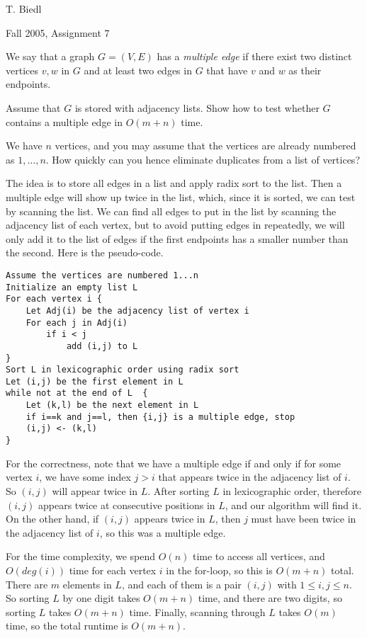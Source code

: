 \begin{authorship}
T. Biedl
\end{authorship}
\begin{usage}
Fall 2005, Assignment 7
\end{usage}

We say that a graph $G=(V,E)$ has a {\em multiple edge} if there
exist two distinct vertices $v,w$ in $G$ and at least two edges
in $G$ that have $v$ and $w$ as their endpoints.

Assume that $G$ is stored with adjacency lists.  Show how to test
whether $G$ contains a multiple edge in $O(m+n)$ time.

\begin{hint}
We have $n$ vertices, and you may assume that the vertices are
already numbered as $1,\dots,n$.  How quickly can you hence
eliminate duplicates from a list of vertices?
\end{hint}

\begin{solution}
The idea is to store all edges in a list and apply radix sort to
the list.  Then a multiple edge will show up twice in the list, which,
since it is sorted, we can test by scanning the list.  We can find all
edges to put in the list by scanning the adjacency list of each vertex,
but to avoid putting edges in repeatedly, we will only add it to the
list of edges if the first endpoints has a smaller number than the second.
Here is the
pseudo-code.

\begin{verbatim}
Assume the vertices are numbered 1...n
Initialize an empty list L
For each vertex i {
    Let Adj(i) be the adjacency list of vertex i
    For each j in Adj(i)
        if i < j
            add (i,j) to L
}
Sort L in lexicographic order using radix sort
Let (i,j) be the first element in L
while not at the end of L  {
    Let (k,l) be the next element in L
    if i==k and j==l, then {i,j} is a multiple edge, stop
    (i,j) <- (k,l)
}
\end{verbatim}

For the correctness, note that we have a multiple edge if and only
if for some vertex $i$, we have some index $j>i$ that appears
twice in the adjacency list of $i$.  So $(i,j)$ will appear twice in
$L$. After sorting $L$ in lexicographic order, therefore $(i,j)$ appears
twice at consecutive positions in $L$, and our algorithm will find it.
On the other hand, if $(i,j)$ appears twice in $L$, then $j$ must have
been twice in the adjacency list of $i$, so this was a multiple edge.

For the time complexity, we spend $O(n)$ time to access all vertices,
and $O(deg(i))$ time for each vertex $i$ in the for-loop, so this is $O(m+n)$
total.  There are $m$ elements in $L$, and each of them is a pair $(i,j)$
with $1\leq i,j\leq n$.  So sorting $L$ by one digit takes $O(m+n)$ time,
and there are two digits, so sorting $L$ takes $O(m+n)$ time.  Finally,
scanning through $L$ takes $O(m)$ time, so the total runtime is $O(m+n)$.
\end{solution}


